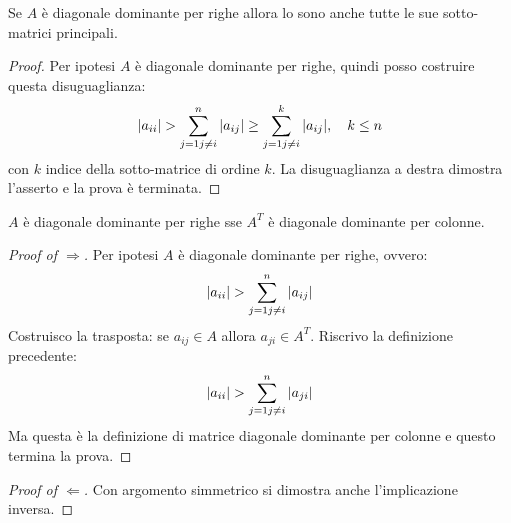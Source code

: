 \begin{exercise}[3.9, Lemma 3.4]
Se $A$ \`e diagonale dominante per righe allora lo sono anche tutte le sue
sotto-matrici principali.
\end{exercise}
\begin{proof}
Per ipotesi $A$ \`e diagonale dominante per righe, quindi posso costruire questa 
disuguaglianza:
\begin{displaymath}
|a_{ii}| > \sum_{j = 1 \\j \not = i}^{n}{|a_{ij}|} \geq \sum_{j = 1 \\j \not =
i}^{k}{|a_{ij}|}, \quad k \leq n
\end{displaymath}
con $k$ indice della sotto-matrice di ordine $k$. La disuguaglianza a destra
dimostra l'asserto e la prova \`e terminata.
\end{proof}

\begin{exercise}[3.9, Lemma 3.5]
$A$ \`e diagonale dominante per righe sse $A^{T}$ \`e diagonale dominante per
colonne.
\end{exercise}
\begin{proof}[Proof of $\Rightarrow$]
Per ipotesi $A$ \`e diagonale dominante per righe, ovvero:
\begin{displaymath}
|a_{ii}| > \sum_{j = 1 \\j \not = i}^{n}{|a_{ij}|}
\end{displaymath}
Costruisco la trasposta: se $a_{ij} \in A$ allora $a_{ji} \in A^{T}$. Riscrivo
la definizione precedente:
\begin{displaymath}
|a_{ii}| > \sum_{j = 1 \\j \not = i}^{n}{|a_{ji}|}
\end{displaymath}
Ma questa \`e la definizione di matrice diagonale dominante per colonne e questo
termina la prova.
\end{proof}

\begin{proof}[Proof of $\Leftarrow$]
Con argomento simmetrico si dimostra anche l'implicazione inversa.
\end{proof}

